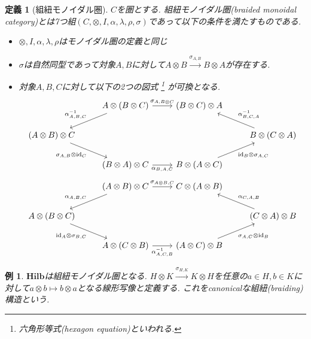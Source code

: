 \documentclass[a4paper,12pt]{ltjsarticle}
\theoremstyle{break}
\newtheorem{defn}[thm]{定義}
\newtheorem{eg}[thm]{例}
\newcommand{\rel}{\mathbf{Rel}}
\newcommand{\hilb}{\mathbf{Hilb}}
\newcommand{\xr}[1]{\xrightarrow{#1}}
\newcommand{\id}{\mathrm{id}}
\newcommand{\al}{\alpha}
\newcommand{\la}{\lambda}
\newcommand{\si}{\sigma}
\newcommand{\ot}{\otimes}
\newcommand{\ti}{\times}
\numberwithin{equation}{section}
\begin{document}
\begin{defn}[組紐モノイダル圏]
  $C$を圏とする. 組紐モノイダル圏(braided monoidal category)とは7つ組$(C,\ot,I,\al,\la,\rho,\si)$であって以下の条件を満たすものである. 
  \begin{itemize}
    \item $\ot,I,\al,\la,\rho$はモノイダル圏の定義と同じ
    \item $\si$は自然同型であって対象$A,B$に対して$A \ot B \xr{\si_{A,B}} B \ot A$が存在する. 
    \item 対象$A,B,C$に対して以下の2つの図式
    \footnote{
      六角形等式(hexagon equation)といわれる. 
    }
    が可換となる.
    \[\begin{tikzcd}
      & {A \ot (B \ot C)} & {(B \ot C)\ot A} \\
      {(A \ot B) \ot C} &&& {B \ot (C \ot A)} \\
      & {(B \ot A) \ot C} & {B \ot (A \ot C)}
      \arrow["{\al_{A,B,C}^{-1}}"', from=1-2, to=2-1]
      \arrow["{\si_{A,B \ot C}}", from=1-2, to=1-3]
      \arrow["{\al_{B,C,A}^{-1}}"', from=2-4, to=1-3]
      \arrow["{\id_{B} \ot \si_{A,C}}"', from=3-3, to=2-4]
      \arrow["{\si_{A,B} \ot \id_C}"', from=2-1, to=3-2]
      \arrow["{\al_{B,A,C}}"', from=3-2, to=3-3]
    \end{tikzcd}\]
    \[\begin{tikzcd}
      & {(A \ot B) \ot C} & {C \ot (A \ot B)} \\
      {A \ot (B \ot C)} &&& {(C \ot A) \ot B} \\
      & {A \ot (C \ot B)} & {(A \ot C) \ot B}
      \arrow["{\al_{A,B,C}}"', from=1-2, to=2-1]
      \arrow["{\si_{A \ot B, C}}", from=1-2, to=1-3]
      \arrow["{\al_{C,A,B}}"', from=2-4, to=1-3]
      \arrow["{\si_{A,C} \ot \id_B}"', from=3-3, to=2-4]
      \arrow["{\id_A \ot \si_{B,C}}"', from=2-1, to=3-2]
      \arrow["{\al_{A,C,B}^{-1}}"', from=3-2, to=3-3]
    \end{tikzcd}\]
  \end{itemize}
\end{defn}   

\begin{eg}
  $\hilb$は組紐モノイダル圏となる. 
  $H \ot K \xr{\si_{H,K}} K \ot H$を任意の$a \in H, b \in K$に対して$a \ot b \mapsto b \ot a$となる線形写像と定義する.  
  これをcanonicalな組紐(braiding)構造という. 
\end{eg}

\end{document}
